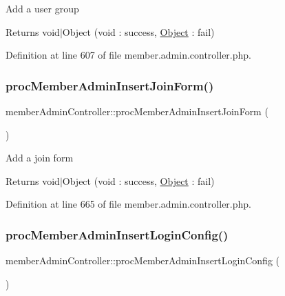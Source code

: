 Add a user group \begin{DoxyReturn}{Returns}
void$\vert$\+Object (void \+: success, \hyperlink{classObject}{Object} \+: fail) 
\end{DoxyReturn}


Definition at line 607 of file member.\+admin.\+controller.\+php.

\hypertarget{classmemberAdminController_a6b1e886dc7e03b2bd91be9f79c9813ad}{}\label{classmemberAdminController_a6b1e886dc7e03b2bd91be9f79c9813ad} 
\subsubsection{\texorpdfstring{proc\+Member\+Admin\+Insert\+Join\+Form()}{procMemberAdminInsertJoinForm()}}
{\footnotesize\ttfamily member\+Admin\+Controller\+::proc\+Member\+Admin\+Insert\+Join\+Form (\begin{DoxyParamCaption}{ }\end{DoxyParamCaption})}

Add a join form \begin{DoxyReturn}{Returns}
void$\vert$\+Object (void \+: success, \hyperlink{classObject}{Object} \+: fail) 
\end{DoxyReturn}


Definition at line 665 of file member.\+admin.\+controller.\+php.

\hypertarget{classmemberAdminController_a8145cf05118cd5728eb93066efce3fa8}{}\label{classmemberAdminController_a8145cf05118cd5728eb93066efce3fa8} 
\subsubsection{\texorpdfstring{proc\+Member\+Admin\+Insert\+Login\+Config()}{procMemberAdminInsertLoginConfig()}}
{\footnotesize\ttfamily member\+Admin\+Controller\+::proc\+Member\+Admin\+Insert\+Login\+Config (\begin{DoxyParamCaption}{ }\end{DoxyParamCaption})}



